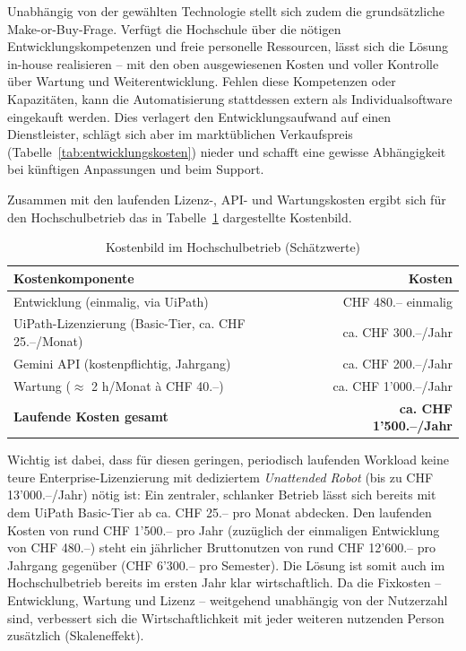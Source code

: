 \documentclass[11pt]{scrartcl}
\begin{document}
Unabhängig von der gewählten Technologie stellt sich zudem die grundsätzliche Make-or-Buy-Frage. Verfügt die Hochschule über die nötigen Entwicklungskompetenzen und freie personelle Ressourcen, lässt sich die Lösung in-house realisieren -- mit den oben ausgewiesenen Kosten und voller Kontrolle über Wartung und Weiterentwicklung. Fehlen diese Kompetenzen oder Kapazitäten, kann die Automatisierung stattdessen extern als Individualsoftware eingekauft werden. Dies verlagert den Entwicklungsaufwand auf einen Dienstleister, schlägt sich aber im marktüblichen Verkaufspreis (Tabelle~\ref{tab:entwicklungskosten}) nieder und schafft eine gewisse Abhängigkeit bei künftigen Anpassungen und beim Support.

Zusammen mit den laufenden Lizenz-, API- und Wartungskosten ergibt sich für den Hochschulbetrieb das in Tabelle~\ref{tab:betriebskosten-hochschule} dargestellte Kostenbild.

\begin{table}[ht]
\centering
\caption{Kostenbild im Hochschulbetrieb (Schätzwerte)}
\label{tab:betriebskosten-hochschule}
\begin{tabularx}{\textwidth}{@{}Xr@{}}
\toprule
\textbf{Kostenkomponente} & \textbf{Kosten} \\
\midrule
Entwicklung (einmalig, via UiPath) & CHF 480.-- einmalig \\
UiPath-Lizenzierung (Basic-Tier, ca. CHF 25.--/Monat) & ca. CHF 300.--/Jahr \\
Gemini API (kostenpflichtig, Jahrgang) & ca. CHF 200.--/Jahr \\
Wartung ($\approx$ 2 h/Monat à CHF 40.--) & ca. CHF 1'000.--/Jahr \\
\midrule
\textbf{Laufende Kosten gesamt} & \textbf{ca. CHF 1'500.--/Jahr} \\
\bottomrule
\end{tabularx}
\end{table}

Wichtig ist dabei, dass für diesen geringen, periodisch laufenden Workload keine teure Enterprise-Lizenzierung mit dediziertem \textit{Unattended Robot} (bis zu CHF 13'000.--/Jahr) nötig ist: Ein zentraler, schlanker Betrieb lässt sich bereits mit dem UiPath Basic-Tier ab ca. CHF 25.-- pro Monat abdecken. Den laufenden Kosten von rund CHF 1'500.-- pro Jahr (zuzüglich der einmaligen Entwicklung von CHF 480.--) steht ein jährlicher Bruttonutzen von rund CHF 12'600.-- pro Jahrgang gegenüber (CHF 6'300.-- pro Semester). Die Lösung ist somit auch im Hochschulbetrieb bereits im ersten Jahr klar wirtschaftlich. Da die Fixkosten -- Entwicklung, Wartung und Lizenz -- weitgehend unabhängig von der Nutzerzahl sind, verbessert sich die Wirtschaftlichkeit mit jeder weiteren nutzenden Person zusätzlich (Skaleneffekt).
\end{document}

